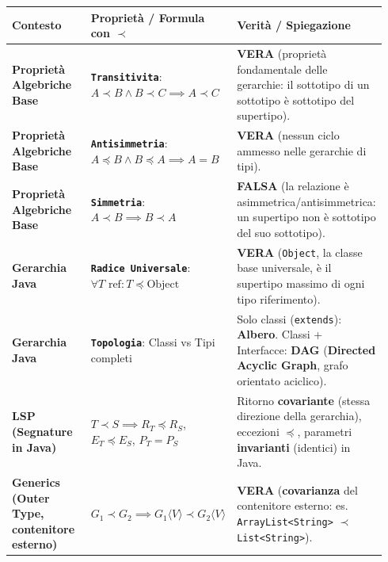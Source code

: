 \begingroup
\small
\renewcommand{\arraystretch}{1.2}
\begin{longtable}{>{\raggedright\arraybackslash}p{0.27\linewidth}>{\raggedright\arraybackslash}p{0.29\linewidth}>{\raggedright\arraybackslash}p{0.38\linewidth}}

\toprule

Contesto & Proprietà / Formula con $\prec$ & Verità / Spiegazione \\

\midrule

\textbf{Proprietà Algebriche Base} & \textbf{\texttt{Transitivita}}: $A \prec B \land B \prec C \implies A \prec C$ & \textbf{VERA} (proprietà fondamentale delle gerarchie: il sottotipo di un sottotipo è sottotipo del supertipo). \\

\textbf{Proprietà Algebriche Base} & \textbf{\texttt{Antisimmetria}}: $A \preceq B \land B \preceq A \implies A = B$ & \textbf{VERA} (nessun ciclo ammesso nelle gerarchie di tipi). \\

\textbf{Proprietà Algebriche Base} & \textbf{\texttt{Simmetria}}: $A \prec B \implies B \prec A$ & \textbf{FALSA} (la relazione è asimmetrica/antisimmetrica: un supertipo non è sottotipo del suo sottotipo). \\

\textbf{Gerarchia Java} & \textbf{\texttt{Radice Universale}}: $\forall T \text{ ref}: T \preceq \text{Object}$ & \textbf{VERA} (\texttt{Object}, la classe base universale, è il supertipo massimo di ogni tipo riferimento). \\

\textbf{Gerarchia Java} & \textbf{\texttt{Topologia}}: Classi vs Tipi completi & Solo classi (\texttt{extends}): \textbf{Albero}. Classi + Interfacce: \textbf{DAG} (\textbf{Directed Acyclic Graph}, grafo orientato aciclico). \\

\textbf{LSP (Segnature in Java)} & $T \prec S \implies R_T \preceq R_S$, $E_T \preceq E_S$, $P_T = P_S$ & Ritorno \textbf{covariante} (stessa direzione della gerarchia), eccezioni $\preceq$, parametri \textbf{invarianti} (identici) in Java. \\

\textbf{Generics (Outer Type, contenitore esterno)} & $G_1 \prec G_2 \implies G_1\langle V \rangle \prec G_2\langle V \rangle$ & \textbf{VERA} (\textbf{covarianza} del contenitore esterno: es. \texttt{ArrayList<String>} $\prec$ \texttt{List<String>}). \\


\end{longtable}
